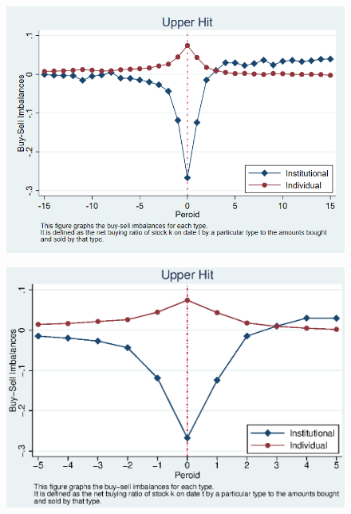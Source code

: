 \documentclass[12pt]{article}
\begin{document}
\begin{figure}[htbp]
\centering
\includegraphics[width=0.7\linewidth]{UI}
\caption{}
\label{fig:ui}
\end{figure}

\begin{figure}[htbp]
\centering
\includegraphics[width=0.7\linewidth]{UI2.eps}
\caption{}
\label{fig:ui2}
\end{figure}
\end{document}
